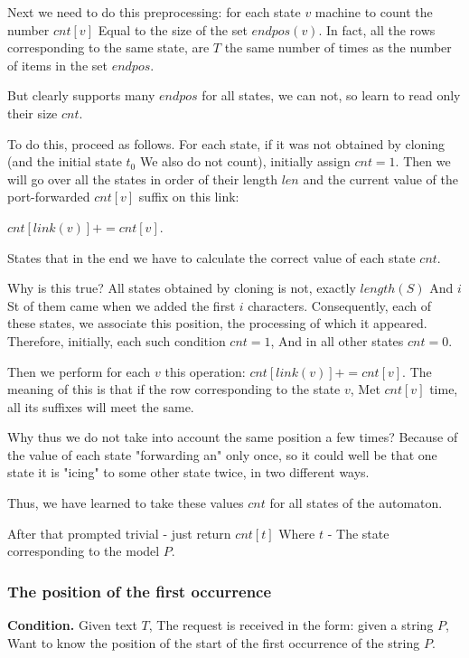 Next we need to do this preprocessing: for each state $v$ machine to count the number $cnt [v]$ Equal to the size of the set $endpos (v)$. In fact, all the rows corresponding to the same state, are $T$ the same number of times as the number of items in the set $endpos$.

But clearly supports many $endpos$ for all states, we can not, so learn to read only their size $cnt$.

To do this, proceed as follows. For each state, if it was not obtained by cloning (and the initial state $t_0$ We also do not count), initially assign $cnt = 1$. Then we will go over all the states in order of their length $len$ and the current value of the port-forwarded $cnt [v]$ suffix on this link:

$cnt [link (v)] + = cnt [v].$

States that in the end we have to calculate the correct value of each state $cnt$.

Why is this true? All states obtained by cloning is not, exactly $length (S)$ And $i$ St of them came when we added the first $i$ characters. Consequently, each of these states, we associate this position, the processing of which it appeared. Therefore, initially, each such condition $cnt = 1$, And in all other states $cnt = 0$.

Then we perform for each $v$ this operation: $cnt [link (v)] + = cnt [v]$. The meaning of this is that if the row corresponding to the state $v$, Met $cnt [v]$ time, all its suffixes will meet the same.

Why thus we do not take into account the same position a few times? Because of the value of each state "forwarding an" only once, so it could well be that one state it is "icing" to some other state twice, in two different ways.

Thus, we have learned to take these values $cnt$ for all states of the automaton.

After that prompted trivial - just return $cnt [t]$ Where $t$ - The state corresponding to the model $P$.

\subsubsection{ The position of the first occurrence }

\textbf{Condition.} Given text $T$, The request is received in the form: given a string $P$, Want to know the position of the start of the first occurrence of the string $P$.

